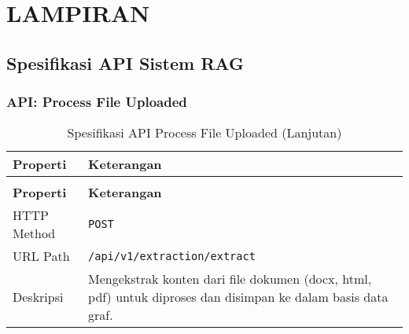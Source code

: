 \chapter*{LAMPIRAN}

\section{Spesifikasi API Sistem RAG}

\subsection{API: Process File Uploaded}

\begin{longtable}{p{}p{}}
	\caption{Spesifikasi API Process File Uploaded} \label{api:process-file}                                                         \\
	\hline
	\textbf{Properti} & \textbf{Keterangan}                                                                                          \\
	\hline \hline
	\endfirsthead %
	\caption[]{Spesifikasi API Process File Uploaded (Lanjutan)}                                                                     \\
	\hline
	\textbf{Properti} & \textbf{Keterangan}                                                                                          \\
	\hline \hline
	\endhead %
	HTTP Method       & \texttt{POST}                                                                                                \\
	URL Path          & \texttt{/api/v1/extraction/extract}                                                                          \\
	Deskripsi         & Mengekstrak konten dari file dokumen (docx, html, pdf) untuk diproses dan disimpan ke dalam basis data graf. \\
	\hline
\end{longtable}


